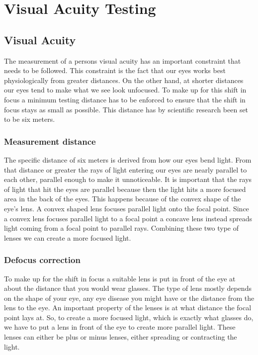\documentclass[12pt,a4paper,notitlepage]{report}
\begin{document}
\chapter{ Visual Acuity Testing}
\section{Visual Acuity}
The measurement of a persons visual acuity has an important constraint that needs to be followed. This constraint is the fact that our eyes works best physiologically from greater distances. On the other hand, at shorter distances our eyes tend to make what we see look unfocused. To make up for this shift in focus a minimum testing distance has to be enforced to ensure that the shift in focus stays as small as possible. This distance has by scientific research been set to be six meters.

\subsection{Measurement distance}
The specific distance of six meters is derived from how our eyes bend light. From that distance or greater the rays of light entering our eyes are nearly parallel to each other, parallel enough to make it unnoticeable. It is important that the rays of light that hit the eyes are parallel because then the light hits a more focused area in the back of the eyes. This happens because of the convex shape of the eye's lens. A convex shaped lens focuses parallel light onto the focal point. Since a convex lens focuses parallel light to a focal point a concave lens instead spreads light coming from a focal point to parallel rays. Combining these two type of lenses we can create a more focused light. 

\subsection{Defocus correction}
To make up for the shift in focus a suitable lens is put in front of the eye at about the distance that you would wear glasses. The type of lens mostly depends on the shape of your eye, any eye disease you might have or the distance from the lens to the eye. An important property of the lenses is at what distance the focal point lays at. So, to create a more focused light, which is exactly what glasses do, we have to put a lens in front of the eye to create more parallel light. These lenses can either be plus or minus lenses, either spreading or contracting the light.
\end{document}
